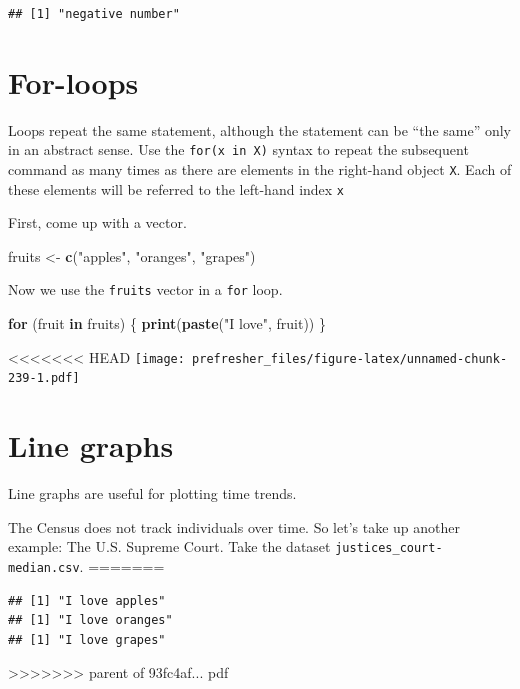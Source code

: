 \documentclass[]{book}
\newenvironment{Shaded}{\begin{snugshade}}{\end{snugshade}}
\newcommand{\ControlFlowTok}[1]{\textcolor[rgb]{0.13,0.29,0.53}{\textbf{#1}}}
\newcommand{\KeywordTok}[1]{\textcolor[rgb]{0.13,0.29,0.53}{\textbf{#1}}}
\newcommand{\NormalTok}[1]{#1}
\newcommand{\StringTok}[1]{\textcolor[rgb]{0.31,0.60,0.02}{#1}}
\theoremstyle{definition}
\theoremstyle{definition}
\theoremstyle{definition}
\theoremstyle{remark}
\begin{document}
\begin{Shaded}
\begin{Highlighting}[]
\begin{Shaded}
\begin{Highlighting}[]
\begin{Shaded}
\begin{Highlighting}[]
\begin{verbatim}
## [1] "negative number"
\end{verbatim}

\hypertarget{for-loops}{%
\section{For-loops}\label{for-loops}}

Loops repeat the same statement, although the statement can be ``the same'' only in an abstract sense. Use the \texttt{for(x\ in\ X)} syntax to repeat the subsequent command as many times as there are elements in the right-hand object \texttt{X}. Each of these elements will be referred to the left-hand index \texttt{x}

First, come up with a vector.

\begin{Shaded}
\begin{Highlighting}[]
\NormalTok{fruits <-}\StringTok{ }\KeywordTok{c}\NormalTok{(}\StringTok{"apples"}\NormalTok{, }\StringTok{"oranges"}\NormalTok{, }\StringTok{"grapes"}\NormalTok{)}
\end{Highlighting}
\end{Shaded}

Now we use the \texttt{fruits} vector in a \texttt{for} loop.

\begin{Shaded}
\begin{Highlighting}[]
\ControlFlowTok{for}\NormalTok{ (fruit }\ControlFlowTok{in}\NormalTok{ fruits) \{}
  \KeywordTok{print}\NormalTok{(}\KeywordTok{paste}\NormalTok{(}\StringTok{"I love"}\NormalTok{, fruit))}
\NormalTok{\}}
\end{Highlighting}
\end{Shaded}

<<<<<<< HEAD
\texttt{[image: prefresher\_files/figure-latex/unnamed-chunk-239-1.pdf]}

\hypertarget{line-graphs}{%
\section{Line graphs}\label{line-graphs}}

Line graphs are useful for plotting time trends.

The Census does not track individuals over time. So let's take up another example: The U.S. Supreme Court. Take the dataset \texttt{justices\_court-median.csv}.
=======
\begin{verbatim}
## [1] "I love apples"
## [1] "I love oranges"
## [1] "I love grapes"
\end{verbatim}
>>>>>>> parent of 93fc4af... pdf


\end{Highlighting}
\end{Shaded}
\end{Highlighting}
\end{Shaded}
\end{Highlighting}
\end{Shaded}
\end{document}
